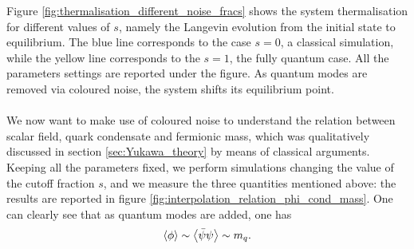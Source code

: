 Figure \ref{fig:thermalisation_different_noise_fracs} shows the system thermalisation for different values of $s$, namely the Langevin evolution from the initial state to equilibrium. The blue line corresponds to the case $s=0$, a classical simulation, while the yellow line corresponds to the $s=1$, the fully quantum case.  All the parameters settings are reported under the figure. As quantum modes are removed via coloured noise, the system shifts its equilibrium point. \\~\\ 
We now want to make use of coloured noise to understand the relation between scalar field, quark condensate and fermionic mass, which was qualitatively discussed in section \ref{sec:Yukawa_theory} by means of classical arguments. \\
Keeping all the parameters fixed, we perform simulations changing the value of the cutoff fraction $s$, and we measure the three quantities mentioned above: the results are reported in figure \ref{fig:interpolation_relation_phi_cond_mass}. 
One can clearly see that as quantum modes are added, one has
\begin{equation*}
	\left\langle \phi \right\rangle \sim \left\langle \bar\psi\psi \right\rangle \sim m_q.
\end{equation*}
